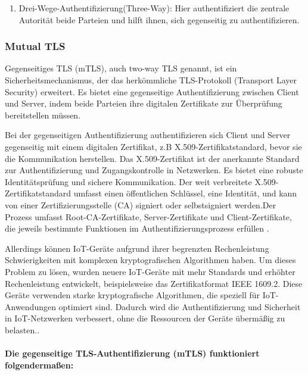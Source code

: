 \begin{enumerate}
\begin{enumerate}
\begin{enumerate}
\end{enumerate}
 

\item Drei-Wege-Authentifizierung(Three-Way): Hier authentifiziert die zentrale Autorität beide Parteien und hilft ihnen, sich gegenseitig zu authentifizieren.
  \end{enumerate}
\end{enumerate}

\subsubsection{Mutual TLS}

Gegenseitiges TLS (mTLS), auch two-way TLS genannt, ist ein Sicherheitsmechanismus, der das herkömmliche TLS-Protokoll (Transport Layer Security) erweitert. Es bietet eine gegenseitige Authentifizierung zwischen Client und Server, indem beide Parteien ihre digitalen Zertifikate zur Überprüfung bereitstellen müssen.

Bei der gegenseitigen Authentifizierung authentifizieren sich Client und Server gegenseitig mit einem digitalen Zertifikat, z.B  X.509-Zertifikatstandard, bevor sie die Kommunikation herstellen. Das X.509-Zertifikat ist der anerkannte Standard zur Authentifizierung und Zugangskontrolle in Netzwerken. Es bietet eine robuste Identitätsprüfung und sichere Kommunikation. Der weit verbreitete X.509-Zertifikatstandard umfasst einen öffentlichen Schlüssel, eine Identität, und kann von einer Zertifizierungsstelle (CA) signiert oder selbstsigniert werden.Der Prozess umfasst Root-CA-Zertifikate, Server-Zertifikate und Client-Zertifikate, die jeweils bestimmte Funktionen im Authentifizierungsprozess erfüllen \cite{khatoun2022cybersecurity} \cite{barenkamp2021iot}.

Allerdings können IoT-Geräte aufgrund ihrer begrenzten Rechenleistung Schwierigkeiten mit komplexen kryptografischen Algorithmen haben.
Um dieses Problem zu lösen, wurden neuere IoT-Geräte mit mehr Standards und erhöhter Rechenleistung entwickelt, beispielsweise das Zertifikatformat IEEE 1609.2. Diese Geräte verwenden starke kryptografische Algorithmen, die speziell für IoT-Anwendungen optimiert sind. Dadurch wird die Authentifizierung und Sicherheit in IoT-Netzwerken verbessert, ohne die Ressourcen der Geräte übermäßig zu belasten.. \cite{khatoun2022cybersecurity}

\paragraph{Die gegenseitige TLS-Authentifizierung (mTLS) funktioniert folgendermaßen:}
\


